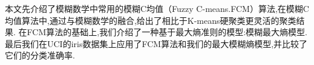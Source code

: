 \begin{cnabstract}
本文先介绍了模糊数学中常用的模糊C均值（Fuzzy C-means.FCM）算法,在模糊C均值算法中,通过与模糊数学的融合,给出了相比于K-means硬聚类更灵活的聚类结果.
在FCM算法的基础上,我们介绍了一种基于最大熵准则的模型:模糊最大熵模型.最后我们在UCI的iris数据集上应用了FCM算法和我们的最大模糊熵模型,并比较了它们的分类准确率.
\end{cnabstract}
\renewcommand{\abstractname}{Abstract}
